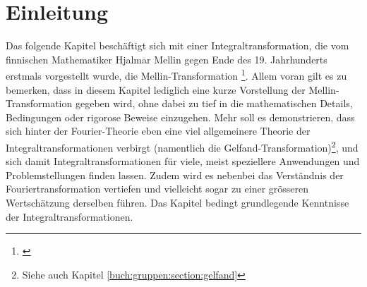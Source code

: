 %
%
%

\section{Einleitung\label{mellin:section:teil0}}

Das folgende Kapitel beschäftigt sich mit einer Integraltransformation,
die vom finnischen Mathematiker Hjalmar Mellin gegen Ende des 19.
Jahrhunderts erstmals vorgestellt wurde, die Mellin-Transformation
\footnote{\cite{mellin:mellin-wikipedia}}.
Allem voran gilt es zu bemerken, dass in diesem Kapitel lediglich eine
kurze Vorstellung der Mellin-Transformation gegeben wird, ohne dabei zu
tief in die mathematischen Details, Bedingungen oder rigorose Beweise 
einzugehen.
Mehr soll es demonstrieren, dass sich hinter der Fourier-Theorie eben eine
viel allgemeinere Theorie der Integraltransformationen verbirgt 
(namentlich die Gelfand-Transformation)\footnote{Siehe auch Kapitel 
\ref{buch:gruppen:section:gelfand}}, und sich damit 
Integraltransformationen für viele, meist speziellere Anwendungen und
Problemstellungen finden lassen.
Zudem wird es nebenbei das Verständnis der Fouriertransformation vertiefen
und vielleicht sogar zu einer grösseren Wertschätzung derselben führen.
Das Kapitel bedingt grundlegende Kenntnisse der Integraltransformationen.







